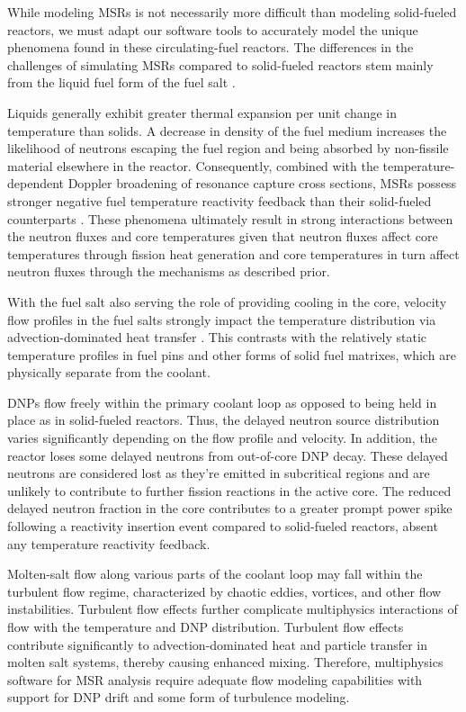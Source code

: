 While modeling \glspl{MSR} is not necessarily more difficult than modeling
solid-fueled reactors, we must adapt our software tools to accurately model the
unique phenomena found in these circulating-fuel reactors. The differences in
the challenges of simulating \glspl{MSR} compared to solid-fueled reactors stem
mainly from the liquid fuel form of the fuel salt \cite{diamond_phenomena_2018,
huff_identifying_2019}.

Liquids generally exhibit greater thermal
expansion per unit change in temperature than solids. A decrease in density of
the fuel medium increases the likelihood of neutrons escaping the fuel region
and being absorbed by non-fissile material elsewhere in the reactor.
Consequently, combined with the temperature-dependent Doppler broadening of
resonance capture cross sections, \glspl{MSR} possess stronger negative fuel
temperature reactivity feedback than their solid-fueled counterparts
\cite{elsheikh_safety_2013}. These
phenomena ultimately result in strong interactions between the neutron fluxes
and core temperatures given that neutron fluxes affect core temperatures
through fission heat generation and core temperatures in turn affect neutron
fluxes through the mechanisms as described prior.

With the fuel
salt also serving the role of providing cooling in the core, velocity flow
profiles in the fuel salts strongly impact the temperature distribution via
advection-dominated heat transfer \cite{diamond_phenomena_2018}. This contrasts
with the relatively static temperature profiles in fuel pins and
other forms of solid fuel matrixes, which are physically separate from the coolant.

\glspl{DNP} flow freely within the primary coolant loop as opposed to
being held in place as in solid-fueled reactors. Thus, the delayed neutron
source distribution varies significantly depending on the flow profile and
velocity. In addition, the reactor loses some delayed neutrons from out-of-core
\gls{DNP} decay. These delayed neutrons are considered lost as they're emitted
in subcritical regions and are unlikely to contribute to further fission
reactions in the active core. The reduced delayed neutron fraction in the core
contributes to a greater prompt power spike following a reactivity insertion
event compared to solid-fueled reactors, absent any temperature reactivity
feedback.

Molten-salt flow along various parts of the coolant loop may fall within the turbulent flow
regime, characterized by chaotic eddies, vortices, and other flow instabilities.
Turbulent flow effects further complicate multiphysics interactions of flow with the temperature
and \gls{DNP} distribution. Turbulent flow effects contribute significantly to advection-dominated
heat and particle transfer in molten salt systems, thereby causing enhanced mixing. Therefore,
multiphysics software for \gls{MSR} analysis require adequate flow modeling capabilities with
support for \gls{DNP} drift and some form of turbulence modeling.

